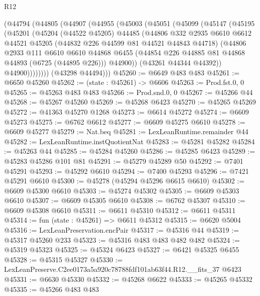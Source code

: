 \begin{lexlean}{R12}
\begin{coremodule}
    (@44794
      (@44805
        (@44907
          (@44955
            (@45003
              (@45051
                (@45099
                  (@45147
                    (@45195
                      (@45201
                        (@45204
                          (@44522 @45205)
                          @44485
                          (@44806
                            @332
                            @2935
                            @6610
                            @6612
                            @44521
                            @45205
                            (@44832 @226 @44599 @81 @44521 @44843 @44718)
                            (@44806
                              @2933
                              @111
                              @6610
                              @6610
                              @44868
                              @6455
                              (@44854 @226 @44885 @81 @44868 @44893 (@6725 (@44895 @226)))
                              @44900))
                          (@43261 @44344 @44392))
                        @44900))))))))
        (@43298 @44494)))
@45260 := @6649 @483 @483
@45261 := @6650 @45260
@45262 := (state : @45261) -> @6606
@45263 := Prod.fst.{0, 0}
@45265 := @45263 @483 @483
@45266 := Prod.snd.{0, 0}
@45267 := @45266 @44
@45268 := @45267 @45260
@45269 := @45268 @6423
@45270 := @45265 @45269
@45272 := @41363 @45270 @1268
@45273 := @6614 @45272
@45274 := @6609 @45273
@45275 := @6762 @6612
@45277 := @6609 @45275 @6610
@45278 := @6609 @45277
@45279 := Nat.beq
@45281 := LexLeanRuntime.remainder @44
@45282 := LexLeanRuntime.instQuotientNat
@45283 := @45281 @45282
@45284 := @45263 @44
@45285 := @45284 @45260
@45286 := @45285 @6423
@45289 := @45283 @45286 @101 @81
@45291 := @45279 @45289 @50
@45292 := @7401 @45291
@45293 := @45292 @6610
@45294 := @7400 @45293
@45296 := @7421 @45291 @6610
@45300 := @45278 (@45294 @45296 @6615 @6610)
@45302 := @6609 @45300 @6610
@45303 := @45274 @45302
@45305 := @6609 @45303 @6610
@45307 := @6609 @45305 @6610
@45308 := @6762 @45307
@45310 := @6609 @45308 @6610
@45311 := @6611 @45310
@45312 := @6611 @45311
@45314 := fun (state : @45261) => @6611 @45312
@45315 := @6620 @5004
@45316 := LexLeanPreservation.encPair
@45317 := @45316 @44
@45319 := @45317 @45260 @233
@45323 := @45316 @483 @483 @482 @482
@45324 := @45319 @45323
@45325 := @45324 @6423
@45327 := @6421 @45325 @6455
@45328 := @45315 @45327
@45330 := LexLeanPreserve.C2ee0173a5a920c78788fdf101ab63f44.R12.__fits_37 @6423
@45331 := @6630 @45330
@45332 := @45268 @6622
@45333 := @45265 @45332
@45335 := @45266 @483 @483

\end{coremodule}
\end{lexlean}
